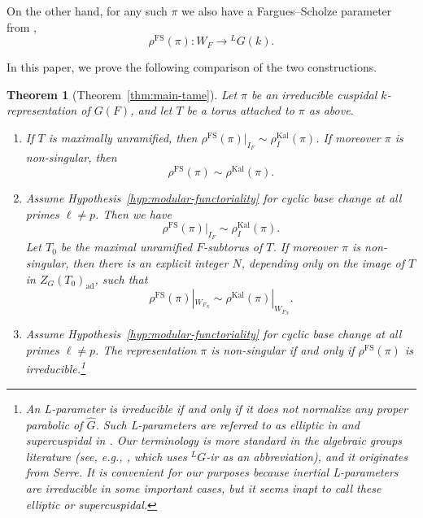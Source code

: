 \documentclass[reqno]{amsart}
\numberwithin{equation}{subsection}
\newcommand{\wh}[1]{\widehat{#1}}
\newcommand{\ld}{{}^L}
\DeclareMathOperator{\ad}{ad}
\DeclareMathOperator{\FS}{FS}
\DeclareMathOperator{\Kal}{Kal}
\newtheorem{thm}{Theorem}[subsection]
\theoremstyle{remark}
\numberwithin{equation}{subsection}
\numberwithin{figure}{subsection}
\begin{document}
On the other hand, for any such $\pi$ we also have a Fargues--Scholze parameter from \cite{FS},
\[
\rho^{\FS}(\pi) : W_F \rightarrow \ld G(k).
\]

In this paper, we prove the following comparison of the two constructions. 

\begin{thm}[Theorem~\ref{thm:main-tame}]\label{thm:II-intro-main-thm}
Let $\pi$ be an irreducible cuspidal $k$-representation of $G(F)$, and let $T$ be a torus attached to $\pi$ as above.
\begin{enumerate}
    \item If $T$ is maximally unramified, then $\rho^{\FS}(\pi)|_{I_F} \sim \rho_I^{\Kal}(\pi)$. If moreover $\pi$ is non-singular, then 
    \[
    \rho^{\FS}(\pi) \sim \rho^{\Kal}(\pi).
    \]
    \item Assume Hypothesis~\ref{hyp:modular-functoriality} for cyclic base change at all primes $\ell \neq p$. Then we have
    \begin{equation}\label{eqn:II-intro-inertial-comparison}
    \rho^{\FS}(\pi)|_{I_F} \sim \rho_I^{\Kal}(\pi).
    \end{equation}
    Let $T_0$ be the maximal unramified $F$-subtorus of $T$. If moreover $\pi$ is non-singular, then there is an explicit integer $N$, depending only on the image of $T$ in $Z_G(T_0)_{\ad}$, such that 
    \begin{equation}\label{eqn:II-intro-full-comparison}
    \rho^{\FS}(\pi)|_{W_{F_N}} \sim \rho^{\Kal}(\pi)|_{W_{F_N}}.
    \end{equation}
    \item Assume Hypothesis~\ref{hyp:modular-functoriality} for cyclic base change at all primes $\ell \neq p$. The representation $\pi$ is non-singular if and only if $\rho^{\FS}(\pi)$ is irreducible.\footnote{An L-parameter is \emph{irreducible} if and only if it does not normalize any proper parabolic of $\wh G$. Such L-parameters are referred to as \emph{elliptic} in \cite[Definition X.2.1]{FS} and \emph{supercuspidal} in \cite[Definition 4.1.1]{Kal21b}. Our terminology is more standard in the algebraic groups literature (see, e.g., \cite{BMR05}, which uses \emph{$\ld G$-ir} as an abbreviation), and it originates from Serre. It is convenient for our purposes because inertial L-parameters are irreducible in some important cases, but it seems inapt to call these \emph{elliptic} or \emph{supercuspidal}.}
\end{enumerate}
\end{thm}
\end{document}

